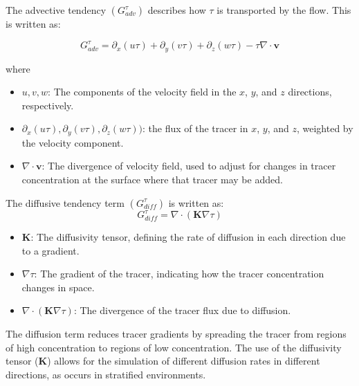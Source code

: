 \documentclass[draft]{agujournal2019}
\begin{document}
The advective tendency $(G^{\tau}_{adv})$ describes how $\tau$ is transported by the flow. This is written as:

$$
G^{\tau}_{{adv}} = \partial_x (u\tau) + \partial_y (v\tau) + \partial_z (w\tau) - \tau \nabla \cdot \mathbf{v}
$$

where

\begin{itemize}
    \item \(u, v, w\): The components of the velocity field in the \(x\), \(y\), and \(z\) directions, respectively.
    \item \(\partial_x (u\tau), \partial_y (v\tau), \partial_z (w\tau))\): the flux of the tracer in \(x\), \(y\), and \(z\), weighted by the velocity component.
    \item \(\nabla \cdot \mathbf{v}\): The divergence of velocity field, used to adjust for changes in tracer concentration at the surface where that tracer may be added.
\end{itemize}

The diffusive tendency term $(G^{\tau}_{{diff}})$ is written as:
$$
G^{\tau}_{{diff}} = \nabla \cdot (\mathbf{K} \nabla \tau)
$$

\begin{itemize}
    \item \(\mathbf{K}\): The diffusivity tensor, defining the rate of diffusion in each direction due to a gradient.
    \item \(\nabla \tau\): The gradient of the tracer, indicating how the tracer concentration changes in space.
    \item \(\nabla \cdot (\mathbf{K} \nabla \tau)\): The divergence of the tracer flux due to diffusion.
\end{itemize}

The diffusion term reduces tracer gradients by spreading the tracer from regions of high concentration to regions of low concentration. The use of the diffusivity tensor (\(\mathbf{K}\)) allows for the simulation of different diffusion rates in different directions, as occurs in stratified environments.
\end{document}
